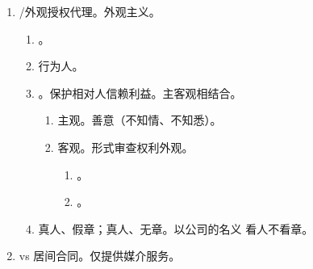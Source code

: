 \begin{enumerate}
\begin{enumerate}
          \item {}。核心考点。。
          \item 无权代理人是否构成不当得利，得先看被代理人态度，不能一概而论。
          \item {}！！。
        \end{enumerate}
  \item {}/外观授权代理。外观主义。
        \begin{enumerate}
          \item {}。
          \item 行为人。
          \item {}。保护相对人信赖利益。主客观相结合。
                \begin{enumerate}
                  \item 主观。善意（不知情、不知悉）。
                  \item 客观。形式审查权利外观。
                        \begin{enumerate}
                          \item {}。
                          \item {}。
                        \end{enumerate}
                \end{enumerate}
          \item 真人、假章；真人、无章。以公司的名义 \yjt 看人不看章。
        \end{enumerate}
  \item vs 居间合同。仅提供媒介服务。
\end{enumerate}

